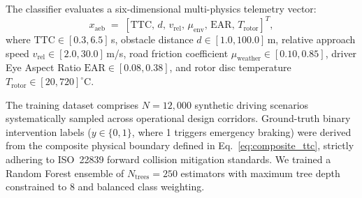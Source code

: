 \documentclass[3p,twocolumn]{elsarticle}
\begin{document}
The classifier evaluates a six-dimensional multi-physics telemetry vector:
\begin{equation}
  x_{\text{aeb}} \;=\; [\text{TTC},\, d,\, v_{\text{rel}},\, \mu_{\text{env}},\, \text{EAR},\, T_{\text{rotor}}]^T,
  \label{eq:aeb_feature_vector}
\end{equation}
where $\text{TTC} \in [0.3, 6.5]$\,s, obstacle distance $d \in [1.0, 100.0]$\,m, relative approach speed $v_{\text{rel}} \in [2.0, 30.0]$\,m/s, road friction coefficient $\mu_{\text{weather}} \in [0.10, 0.85]$, driver Eye Aspect Ratio $\text{EAR} \in [0.08, 0.38]$, and rotor disc temperature $T_{\text{rotor}} \in [20, 720]^\circ$C.

The training dataset comprises $N = 12{,}000$ synthetic driving scenarios systematically sampled across operational design corridors. Ground-truth binary intervention labels ($y \in \{0, 1\}$, where 1 triggers emergency braking) were derived from the composite physical boundary defined in Eq.~\eqref{eq:composite_ttc}, strictly adhering to ISO~22839 forward collision mitigation standards. We trained a Random Forest ensemble of $N_{\text{trees}} = 250$ estimators with maximum tree depth constrained to 8 and balanced class weighting.
\end{document}
